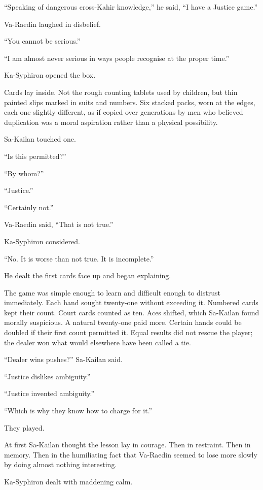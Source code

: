 “Speaking of dangerous cross-Kahir knowledge,” he said, “I have a Justice game.”\par
Va-Raedin laughed in disbelief.\par
“You cannot be serious.”\par
“I am almost never serious in ways people recognise at the proper time.”\par
Ka-Syphiron opened the box.\par
Cards lay inside. Not the rough counting tablets used by children, but thin painted slips marked in suits and numbers. Six stacked packs, worn at the edges, each one slightly different, as if copied over generations by men who believed duplication was a moral aspiration rather than a physical possibility.\par
Sa-Kailan touched one.\par
“Is this permitted?”\par
“By whom?”\par
“Justice.”\par
“Certainly not.”\par
Va-Raedin said, “That is not true.”\par
Ka-Syphiron considered.\par
“No. It is worse than not true. It is incomplete.”\par
He dealt the first cards face up and began explaining.\par
The game was simple enough to learn and difficult enough to distrust immediately. Each hand sought twenty-one without exceeding it. Numbered cards kept their count. Court cards counted as ten. Aces shifted, which Sa-Kailan found morally suspicious. A natural twenty-one paid more. Certain hands could be doubled if their first count permitted it. Equal results did not rescue the player; the dealer won what would elsewhere have been called a tie.\par
“Dealer wins pushes?” Sa-Kailan said.\par
“Justice dislikes ambiguity.”\par
“Justice invented ambiguity.”\par
“Which is why they know how to charge for it.”\par
They played.\par
At first Sa-Kailan thought the lesson lay in courage. Then in restraint. Then in memory. Then in the humiliating fact that Va-Raedin seemed to lose more slowly by doing almost nothing interesting.\par
Ka-Syphiron dealt with maddening calm.\par
